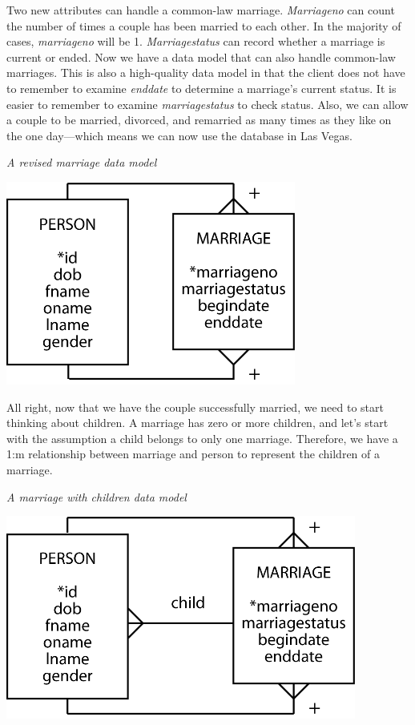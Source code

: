 \documentclass[
]{article}
\begin{document}
Two new attributes can handle a common-law marriage. \emph{Marriageno} can
count the number of times a couple has been married to each other. In
the majority of cases, \emph{marriageno} will be 1. \emph{Marriagestatus} can
record whether a marriage is current or ended. Now we have a data model
that can also handle common-law marriages. This is also a high-quality
data model in that the client does not have to remember to examine
\emph{enddate} to determine a marriage's current status. It is easier to
remember to examine \emph{marriagestatus} to check status. Also, we can allow
a couple to be married, divorced, and remarried as many times as they
like on the one day---which means we can now use the database in Las
Vegas.

\emph{A revised marriage data model}

\includegraphics[width=3.75in,height=\textheight]{Figures/Chapter 7/marriage-4.png}

All right, now that we have the couple successfully married, we need to
start thinking about children. A marriage has zero or more children, and
let's start with the assumption a child belongs to only one marriage.
Therefore, we have a 1:m relationship between marriage and person to
represent the children of a marriage.

\emph{A marriage with children data model}

\includegraphics[width=4.53125in,height=\textheight]{Figures/Chapter 7/marriage-5.png}
\end{document}
